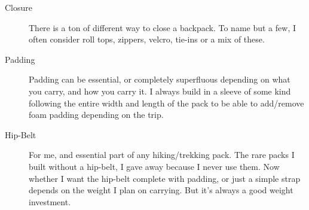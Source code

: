 \begin{description}
  \item [Closure] There is a ton of different way to close a backpack. To name but a few, I often consider roll tops, zippers, velcro, tie-ins or a mix of these.

  \item [Padding] Padding can be essential, or completely superfluous depending on what you carry, and how you carry it. I always build in a sleeve of some kind following the entire width and length of the pack to be able to add/remove foam padding depending on the trip.

  \item [Hip-Belt] For me, and essential part of any hiking/trekking pack. The rare packs I built without a hip-belt, I gave away because I never use them. Now whether I want the hip-belt complete with padding, or just a simple strap depends on the weight I plan on carrying. But it's always a good weight investment.

\end{description}
